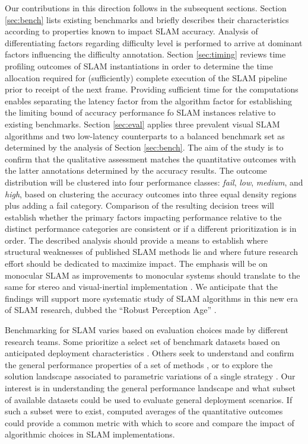 Our contributions in this direction follows in the subsequent sections.
Section \ref{sec:bench} lists existing benchmarks and briefly describes their
characteristics according to properties known to impact SLAM accuracy.
Analysis of differentiating factors regarding difficulty level is performed
to arrive at dominant factors influencing the difficulty annotation.
Section \ref{sec:timing} reviews time profiling outcomes of SLAM
instantiations in order to determine the time allocation required for
(sufficiently) complete execution of the SLAM pipeline prior to receipt of the 
next frame.  Providing sufficient time for the computations enables
separating the latency factor from the algorithm factor for establishing the
limiting bound of accuracy performance fo SLAM instances relative to existing
benchmarks.
Section \ref{sec:eval} applies 
three prevalent visual SLAM
algorithms and two low-latency counterparts
to a 
balanced
benchmark set as determined by the analysis of Section \ref{sec:bench}. The aim
of the study is to confirm that the qualitative assessment matches the
quantitative outcomes with the latter annotations determined by the
accuracy results.
The outcome distribution will be clustered into four performance classes:
\textit{fail}, \textit{low}, \textit{medium}, and \textit{high}, based on 
clustering the accuracy outcomes into three equal density regions plus
adding a fail category.  Comparison of the resulting decision trees will
establish whether the primary factors impacting performance relative to the
distinct performance categories are consistent or if a different
prioritization is in order.
The described analysis should provide a means to establish where structural
weaknesses of published SLAM methods lie and where future research effort
should be dedicated to maximize impact. %
The emphasis will be on monocular SLAM as improvements to monocular systems
should translate to the same for stereo and visual-inertial implementation
\cite{zhao2019closednav,zhao2019tro}.
We anticipate that the findings will support more systematic study of SLAM
algorithms in this new era of SLAM research, dubbed the ``Robust
Perception Age'' \cite{cadena2016past}.








Benchmarking for SLAM varies based on evaluation choices made by different
research teams. Some prioritize a select set of benchmark datasets based on
anticipated deployment characteristics \cite{delmerico2018benchmark}. 
Others seek to understand and confirm the general performance properties of
a set of methods \cite{li2016experimental}, or to explore the solution
landscape associated to parametric variations of a single strategy
\cite{nardi2015introducing}. Our interest is in understanding the general
performance landscape and what subset of available datasets could be used
to evaluate general deployment scenarios. If such a subset were to exist,
computed averages of the quantitative outcomes could provide a common
metric with which to score and compare the impact of algorithmic choices in
SLAM implementations.


